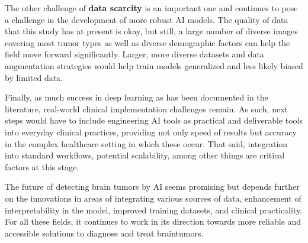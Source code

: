 \documentclass[conference]{IEEEtran}
\begin{document}
The other challenge of \textbf{data scarcity} is an important one and continues to pose a challenge in the development of more robust AI models. The quality of data that this study has at present is okay, but still, a large number of diverse images covering most tumor types as well as diverse demographic factors can help the field move forward significantly. Larger, more diverse datasets and data augmentation strategies would help train models generalized and less likely biased by limited data.

Finally, as much success in deep learning as has been documented in the literature, real-world clinical implementation challenges remain. As such, next steps would have to include engineering AI tools as practical and deliverable tools into everyday clinical practices, providing not only speed of results but accuracy in the complex healthcare setting in which these occur. That said, integration into standard workflows, potential scalability, among other things are critical factors at this stage.

The future of detecting brain tumors by AI seems promising but depends further on the innovations in areas of integrating various sources of data, enhancement of interpretability in the model, improved training datasets, and clinical practicality. For all these fields, it continues to work in its direction towards more reliable and accessible solutions to diagnose and treat braintumors.
\end{document}
